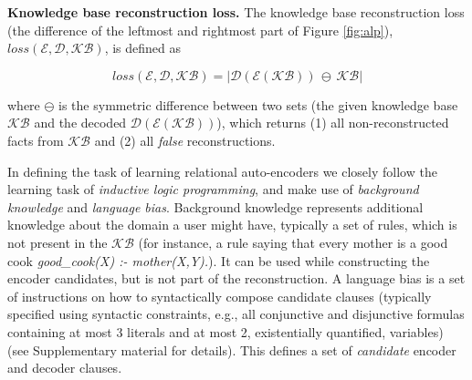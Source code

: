\begin{definition}
\textbf{Knowledge base reconstruction loss.}
The knowledge base reconstruction loss (the difference of the leftmost and rightmost part of Figure \ref{fig:alp}), $loss(\mathcal{E}, \mathcal{D}, \mathcal{KB})$, is defined as

\begin{equation}
    loss(\mathcal{E},\mathcal{D},\mathcal{KB}) = | \mathcal{D}(\mathcal{E}(\mathcal{KB})) \, \ominus \, \mathcal{KB} |
    \label{eq:reconstruction}
\end{equation}


where $\ominus$ is the symmetric difference between two sets (the given knowledge base $\mathcal{KB}$ and the decoded $\mathcal{D}(\mathcal{E}(\mathcal{KB}))$), which returns (1) all non-reconstructed facts from $\mathcal{KB}$ and (2)  all \textit{false} reconstructions.
\end{definition}



In defining the task of learning relational auto-encoders we closely follow the learning task of \textit{inductive logic programming}, and make use of \textit{background knowledge} and \textit{language bias}.
Background knowledge represents additional knowledge about the domain a user might have, typically a set of rules, which is not present in the $\mathcal{KB}$ (for instance, a rule saying that every mother is a good cook \textit{good\_cook(X) :- mother(X,Y).}).
It can be used while constructing the encoder candidates, but is not part of the reconstruction.
A language bias is a set of instructions on how to syntactically compose candidate clauses (typically specified using syntactic constraints, e.g., all conjunctive and disjunctive formulas containing at most 3 literals and at most 2, existentially quantified, variables) (see Supplementary material for details).
This defines a set of \textit{candidate} encoder and decoder clauses.



